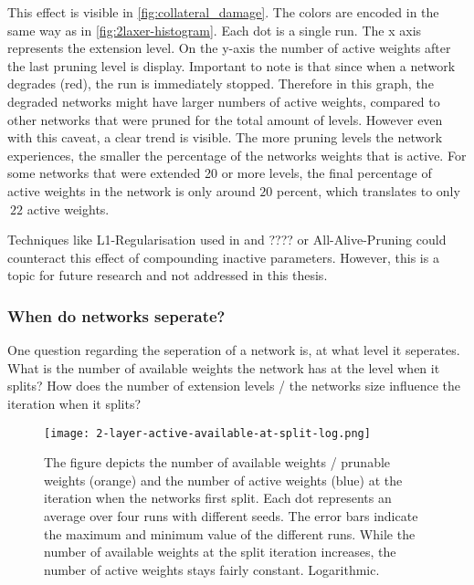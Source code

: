 This effect is visible in \ref{fig:collateral_damage}.
The colors are encoded in the same way as in \ref{fig:2laxer-histogram}.
Each dot is a single run. 
The x axis represents the extension level.
On the y-axis the number of active weights after the last pruning level is display.
Important to note is that since when a network degrades (red), the run is immediately stopped.
Therefore in this graph, the degraded networks might have larger numbers of active weights, compared to other networks that were pruned for the total amount of levels.
However even with this caveat, a clear trend is visible.
The more pruning levels the network experiences, the smaller the percentage of the networks weights that is active.
For some networks that were extended 20 or more levels, the final percentage of active weights in the network is only around $20$ percent, which translates to only $~22$ active weights.

Techniques like L1-Regularisation used in \autocite{HanEtAl15} and ??\autocite{DBLP:conf/iclr/FrankleC19}?? or All-Alive-Pruning \autocite{AllAlivePruning} could counteract this effect of compounding inactive parameters.
However, this is a topic for future research and not addressed in this thesis. 

\subsubsection{When do networks seperate?}
One question regarding the seperation of a network is, at what level it seperates.
What is the number of available weights the network has at the level when it splits?
How does the number of extension levels / the networks size influence the iteration when it splits?

\begin{figure}[ht]
    \centering
    \texttt{[image: 2-layer-active-available-at-split-log.png]}
    \caption{
        The figure depicts the number of available weights / prunable weights (orange) and the number of active weights (blue) at the iteration when the networks first split.
        Each dot represents an average over four runs with different seeds.
        The error bars indicate the maximum and minimum value of the different runs.
        While the number of available weights at the split iteration increases, the number of active weights stays fairly constant.
        Logarithmic.
    }
    \label{fig:2l-active-split}
\end{figure}

